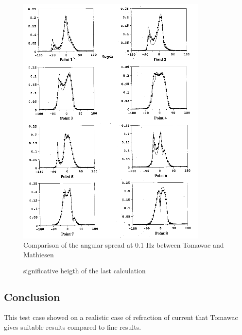 \begin{figure} [!h]
\centering
\includegraphics[width=0.85\textwidth]{repartangulaire.png}
 \caption{Comparison of the angular spread at 0.1 Hz between Tomawac and Mathiesen}
\label{repartang}
\end{figure}

\begin{figure} [!h]
\centering
{}
 \caption{significative heigth of the last calculation}
\label{resultswhirl}
\end{figure}

\subsection{Conclusion}
This test case showed on a realistic case of refraction of current that Tomawac
gives suitable results compared to fine results.
